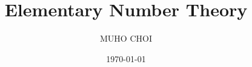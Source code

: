\title{Elementary Number Theory}
\author{MUHO CHOI}
\date{\today}
\newcommand{\bookversion}{0.1.0}
\newcommand{\bookslug}{elementary-number-theory}
\newcommand{\bookcoursecode}{MTH260}
\newcommand{\bookdisplaytitle}{Elementary Number Theory}
